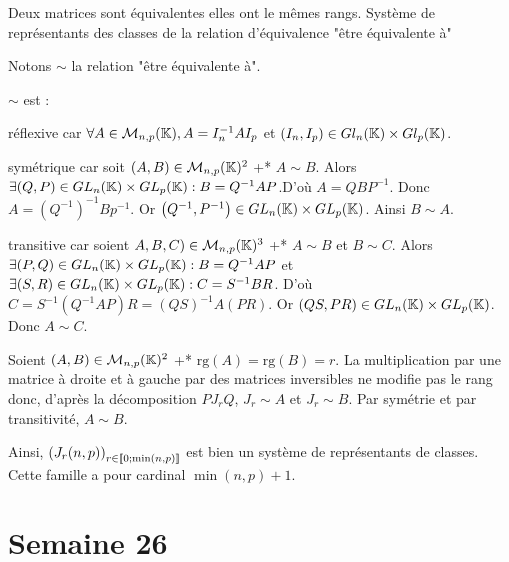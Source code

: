 \documentclass{article}
\renewenvironment{question_kholle}[2][ ]
{
	\subsection{\texorpdfstring{#2}{}}
	\notblank{#1}
	{
		\noindent #1
		\bigbreak
	}
	{}
	\begin{proof}
}
{
	\end{proof}
}
\begin{document}
\begin{question_kholle}[{
				Soient $(A, B) \in \mathcal{M}_{n, p}(\mathbb{K})^2$. $A$ est équivalente à $B$ s'il existe $(P, Q) \in GL_n(\K) \times GL_p(\K)$ \tq* $B = Q^{-1} A P$.

				Montrons que deux matrices sont équivalentes \ssi elles ont le mêmes rangs, que "être équivalente à" est une relation d'équivalence, qu'il y a $\min(n, p) + 1$ classes et que $\left(J_r(n, p)\right)_{r \in \lient 0; \min(n, p) \rient}$ est un système de représentants de classes.
			}]
	{Deux matrices sont équivalentes \ssi elles ont le mêmes rangs. Système de représentants des classes de la relation d'équivalence "être équivalente à"}

	Notons $\sim$ la relation "être équivalente à".

	$\sim$ est :
	\begin{liste}
		\item réflexive car $\forall A \in \mathcal{M}_{n, p}(\mathbb K), A = I_n^{-1} A I_p$ et $(I_n, I_p) \in Gl_n(\mathbb K) \times Gl_p(\mathbb K)$.
		\item symétrique car soit $(A, B) \in \mathcal{M}_{n, p}(\mathbb K)^2$ \tq+* $A \sim B$.
		Alors $\exists (Q, P) \in GL_n(\mathbb K) \times GL_p(\mathbb K) : B = Q^{-1} A P$.D'où $A = Q B P^{-1}$.
		Donc $A = \left(Q^{-1}\right)^{-1} B p^{-1}$.
		Or $\left(Q^{-1}, P^{-1}\right) \in GL_n(\mathbb K) \times GL_p(\mathbb K)$. Ainsi $B \sim A$.
		\item transitive car soient $A, B, C) \in \mathcal{M}_{n, p}(\mathbb K)^3$ \tq+* $A \sim B$ et $B \sim C$.
		Alors $\exists (P, Q) \in GL_n(\mathbb K) \times GL_p(\mathbb K) : B = Q^{-1} A P$ et $\exists (S, R) \in GL_n(\mathbb K) \times GL_p(\mathbb K) : C = S^{-1} B R$.
		D'où $C = S^{-1} \left(Q^{-1} A P\right) R = (QS)^{-1} A (PR)$.
		Or $(QS, PR) \in GL_n(\mathbb K) \times GL_p(\mathbb K)$.
		Donc $A \sim C$.
	\end{liste}

	Soient $(A, B) \in \mathcal{M}_{n, p}(\mathbb K)^2$ \tq+* $\mathrm{rg}(A) = \mathrm{rg}(B) = r$.
	La multiplication par une matrice à droite et à gauche par des matrices inversibles ne modifie pas le rang donc, d'après la décomposition $P J_r Q$, $J_r \sim A$ et $J_r \sim B$.
	Par symétrie et par transitivité, $A \sim B$.

	Ainsi, $\left(J_r(n, p)\right)_{r \in \lient 0; \min(n, p) \rient}$ est bien un système de représentants de classes.
	Cette famille a pour cardinal $\min(n, p) + 1$.
\end{question_kholle}
\pagebreak\section{Semaine 26}
\end{document}
